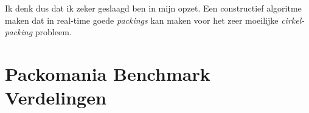 \documentclass[12pt,a4paper,oneside]{book}
\begin{document}

Ik denk dus dat ik zeker geslaagd ben in mijn opzet.
Een constructief algoritme maken dat in real-time goede \textit{packings} kan maken voor het zeer moeilijke \textit{cirkel-packing} probleem.



\newpage






\appendix

\chapter{Packomania Benchmark Verdelingen} \label{append:packomania-benchmark-verdelingen}
\end{document}
